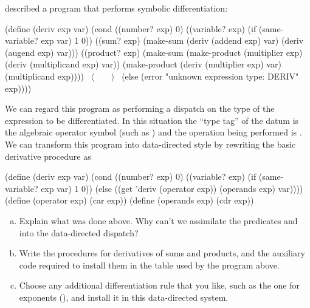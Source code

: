\begin{exerciseGroup}
\label{Exercise 2.73}
  described a
program that performs symbolic differentiation:

\begin{codeBlock}
(define (deriv exp var)
  (cond ((number? exp) 0)
        ((variable? exp)
         (if (same-variable? exp var) 1 0))
        ((sum? exp)
         (make-sum (deriv (addend exp) var)
                   (deriv (augend exp) var)))
        ((product? exp)
         (make-sum (make-product
                    (multiplier exp)
                    (deriv (multiplicand exp) var))
                   (make-product
                    (deriv (multiplier exp) var)
                    (multiplicand exp))))
        ~\(\langle \)~~~~\(\rangle \)~
        (else (error "unknown expression type:
                      DERIV" exp))))
\end{codeBlock}

We can regard this program as performing a dispatch on the type of the
expression to be differentiated.  In this situation the ``type tag'' of the
datum is the algebraic operator symbol (such as \code{+}) and the operation
being performed is .  We can transform this program into
data-directed style by rewriting the basic derivative procedure as

\begin{codeBlock}
(define (deriv exp var)
  (cond ((number? exp) 0)
        ((variable? exp) (if (same-variable? exp var)
                             1
                             0))
        (else ((get 'deriv (operator exp))
               (operands exp) var))))
(define (operator exp) (car exp))
(define (operands exp) (cdr exp))
\end{codeBlock}

\begin{enumerate}[a.]

\item
Explain what was done above.  Why can't we assimilate the predicates
 and  into the data-directed dispatch?

\item
Write the procedures for derivatives of sums and products, and the auxiliary
code required to install them in the table used by the program above.

\item
Choose any additional differentiation rule that you like, such as the one for
exponents (), and install it in this data-directed
system.


\end{enumerate}
\end{exerciseGroup}
